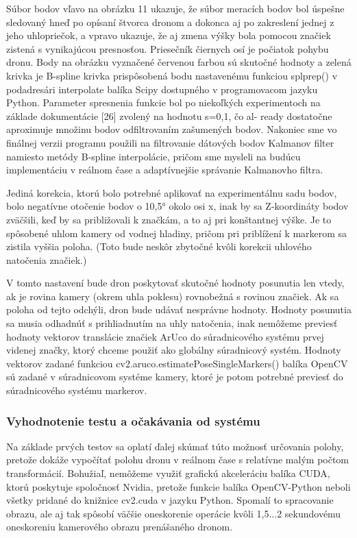 {Súbor bodov vľavo na obrázku 11 ukazuje, že súbor meracích bodov bol úspešne sledovaný hneď po opísaní štvorca dronom a dokonca aj po zakreslení jednej z jeho uhlopriečok, a vpravo ukazuje, že aj zmena výšky bola pomocou značiek zistená s vynikajúcou presnosťou. Priesečník čiernych osí je počiatok pohybu dronu. Body na obrázku vyznačené červenou farbou sú skutočné hodnoty a zelená krivka je B-spline krivka prispôsobená bodu nastavenému funkciou splprep() v podadresári interpolate balíka Scipy dostupného v programovacom jazyku Python. Parameter spresnenia funkcie bol po niekoľkých experimentoch na základe dokumentácie [26] zvolený na hodnotu s=0,1, čo al- ready dostatočne aproximuje množinu bodov odfiltrovaním zašumených bodov. Nakoniec sme vo finálnej verzii programu použili na filtrovanie dátových bodov Kalmanov filter namiesto metódy B-spline interpolácie, pričom sme mysleli na budúcu implementáciu v reálnom čase a adaptívnejšie správanie Kalmanovho filtra. 

Jediná korekcia, ktorú bolo potrebné aplikovať na experimentálnu sadu bodov, bolo negatívne otočenie bodov o 10,5° okolo osi x, inak by sa Z-koordináty bodov zväčšili, keď by sa približovali k značkám, a to aj pri konštantnej výške. Je to spôsobené uhlom kamery od vodnej hladiny, pričom pri priblížení k markerom sa zistila vyššia poloha. (Toto bude neskôr zbytočné kvôli korekcii uhlového natočenia značiek.)

V tomto nastavení bude dron poskytovať skutočné hodnoty posunutia len vtedy, ak je rovina kamery (okrem uhla poklesu) rovnobežná s rovinou značiek. Ak sa poloha od tejto odchýli, dron bude udávať nesprávne hodnoty. Hodnoty posunutia sa musia odhadnúť s prihliadnutím na uhly natočenia, inak nemôžeme previesť hodnoty vektorov translácie značiek ArUco do súradnicového systému prvej videnej značky, ktorý chceme použiť ako globálny súradnicový systém.  Hodnoty vektorov zadané funkciou cv2.aruco.estimatePoseSingleMarkers() balíka OpenCV sú zadané v súradnicovom systéme kamery, ktoré je potom potrebné previesť do súradnicového systému markerov. 

\subsubsection{Vyhodnotenie testu a očakávania od systému}
Na základe prvých testov sa oplatí ďalej skúmať túto možnosť určovania polohy, pretože dokáže vypočítať polohu dronu v reálnom čase s relatívne malým počtom transformácií. Bohužiaľ, nemôžeme využiť grafickú akceleráciu balíka CUDA, ktorú poskytuje spoločnosť Nvidia, pretože funkcie balíka OpenCV-Python neboli všetky pridané do knižnice cv2.cuda v jazyku Python. Spomalí to spracovanie obrazu, ale aj tak spôsobí väčšie oneskorenie operácie kvôli 1,5...2 sekundovému oneskoreniu kamerového obrazu prenášaného dronom. 

}
